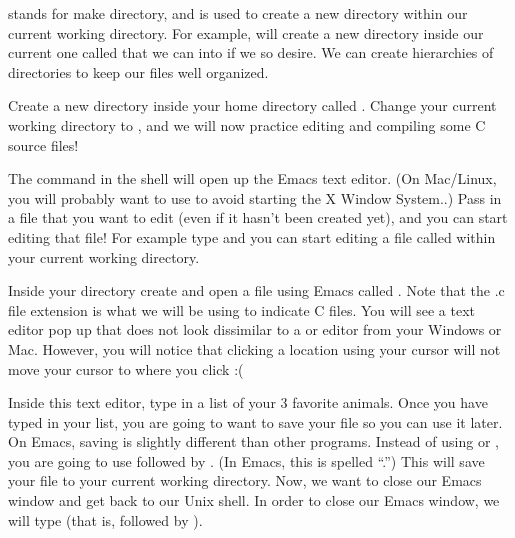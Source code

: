\documentclass{tufte-handout}
\begin{document}
 stands for make directory, and is used to create a new
directory within our current working directory. For example,
 will create a new directory inside our
current one called  that we can  into
if we so desire. We can create hierarchies of directories to keep our
files well organized.

Create a new directory inside your home directory called
. Change your current working directory to
, and we will now practice editing and compiling
some C source files!

The  command in the shell will open up the Emacs text%
 editor. (On Mac/Linux, you will probably want to
use  to avoid starting the X Window System..) Pass in
a file that you want to edit (even if it hasn't been created yet), and
you can start editing that file! For example type  and you can start editing a file called
 within your current working directory.

Inside your  directory create and open a file
using Emacs called . Note that the .c file
extension is what we will be using to indicate C files. You will see a
text editor pop up that does not look dissimilar to a
 or  editor from your
Windows or Mac. However, you will notice that clicking a location using
your cursor will not move your cursor to where you click :(

Inside this text editor, type in a list of your 3 favorite animals. Once
you have typed in your list, you are going to want to save your file so
you can use it later. On Emacs, saving is slightly different than other
programs. Instead of using  or , you
are going to use  followed by
.
(In Emacs, this is spelled ``.'') This will save your
file to your current working directory. Now, we want to close our Emacs
window and get back to our Unix shell. In order to close our Emacs
window, we will type  (that is, 
followed by ).
\end{document}
